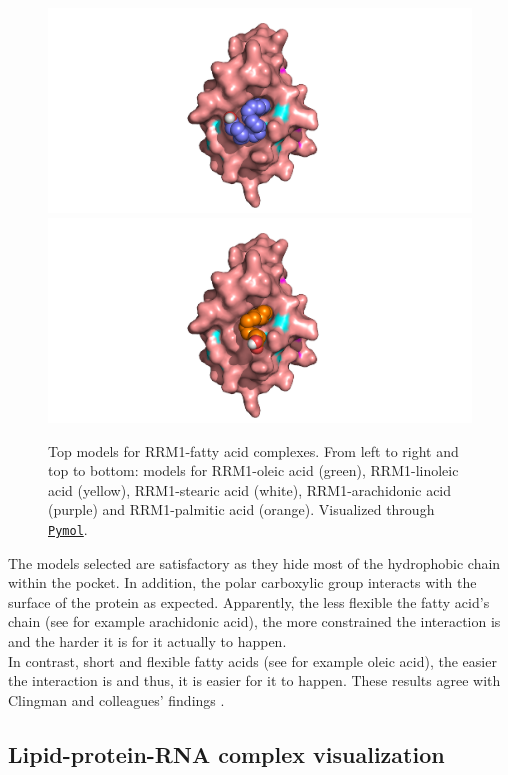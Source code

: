 \begin{figure}[htbp!]
        \includegraphics[trim={6.5cm 0 6.5cm 0},clip,width=\linewidth]{assets/RRM1_arachidonic_solo.png}
    \endminipage\hfill
        \includegraphics[trim={6.5cm 0 5.5cm 0},clip,width=\linewidth]{assets/RRM1_palmitic_solo.png}
    \endminipage
    \caption[Top models for RRM1-fatty acid complexes.]{Top models for RRM1-fatty acid complexes. From left to right and top to bottom: models for RRM1-oleic acid (green), RRM1-linoleic acid (yellow), RRM1-stearic acid (white), RRM1-arachidonic acid (purple) and RRM1-palmitic acid (orange). Visualized through \href{https://pymol.org/2/}{\texttt{Pymol}}.}
    \label{fig:fattyAcidModels}
\end{figure}

The models selected are satisfactory as they hide most of the hydrophobic chain within the pocket. In addition, the polar carboxylic group interacts with the surface of the protein as expected. Apparently, the less flexible the fatty acid's chain (see for example arachidonic acid), the more constrained the interaction is and the harder it is for it actually to happen.\\

In contrast, short and flexible fatty acids (see for example oleic acid), the easier the interaction is and thus, it is easier for it to happen. These results agree with Clingman and colleagues' findings \cite{clingman_2014}.

\subsection{Lipid-protein-RNA complex visualization}


